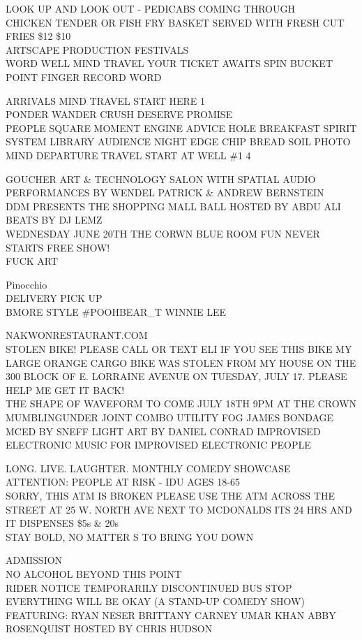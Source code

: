 \documentclass[10pt,letterpaper]{article}
\begin{document}
LOOK UP AND LOOK OUT {-} PEDICABS COMING THROUGH\\
CHICKEN TENDER OR FISH FRY BASKET SERVED WITH FRESH CUT FRIES \$12 \$10\\
ARTSCAPE PRODUCTION FESTIVALS\\
WORD WELL MIND TRAVEL YOUR TICKET AWAITS SPIN BUCKET POINT FINGER RECORD WORD

ARRIVALS MIND TRAVEL START HERE 1\\
PONDER WANDER CRUSH DESERVE PROMISE\\
PEOPLE SQUARE MOMENT ENGINE ADVICE HOLE BREAKFAST SPIRIT SYSTEM LIBRARY AUDIENCE NIGHT EDGE CHIP BREAD SOIL PHOTO\\
MIND DEPARTURE TRAVEL START AT WELL \#1 4

GOUCHER ART \& TECHNOLOGY SALON WITH SPATIAL AUDIO PERFORMANCES BY WENDEL PATRICK \& ANDREW BERNSTEIN\\
DDM PRESENTS THE SHOPPING MALL BALL HOSTED BY ABDU ALI BEATS BY DJ LEMZ\\
WEDNESDAY JUNE 20TH THE CORWN BLUE ROOM FUN NEVER STARTS FREE SHOW!\\
FUCK ART

Pinocchio\\
DELIVERY PICK UP\\
BMORE STYLE \#POOHBEAR\_T WINNIE LEE

NAKWONRESTAURANT.COM\\
STOLEN BIKE!  PLEASE CALL OR TEXT ELI IF YOU SEE THIS BIKE MY LARGE ORANGE CARGO BIKE WAS STOLEN FROM MY HOUSE ON THE 300 BLOCK OF E. LORRAINE AVENUE ON TUESDAY, JULY 17.  PLEASE HELP ME GET IT BACK!\\
THE SHAPE OF WAVEFORM TO COME JULY 18TH 9PM AT THE CROWN MUMBLINGUNDER JOINT COMBO UTILITY FOG JAMES BONDAGE MCED BY SNEFF LIGHT ART BY DANIEL CONRAD IMPROVISED ELECTRONIC MUSIC FOR IMPROVISED ELECTRONIC PEOPLE

LONG. LIVE. LAUGHTER.  MONTHLY COMEDY SHOWCASE\\
ATTENTION: PEOPLE AT RISK {-} IDU AGES 18{-}65\\
SORRY, THIS ATM IS BROKEN PLEASE USE THE ATM ACROSS THE STREET AT 25 W. NORTH AVE NEXT TO MCDONALDS ITS 24 HRS AND IT DISPENSES \$5s \& 20s\\
STAY BOLD, NO MATTER S TO BRING YOU DOWN

ADMISSION\\
NO ALCOHOL BEYOND THIS POINT\\
RIDER NOTICE TEMPORARILY DISCONTINUED BUS STOP\\
EVERYTHING WILL BE OKAY (A STAND{-}UP COMEDY SHOW) FEATURING: RYAN NESER BRITTANY CARNEY UMAR KHAN ABBY ROSENQUIST HOSTED BY CHRIS HUDSON
\end{document}
